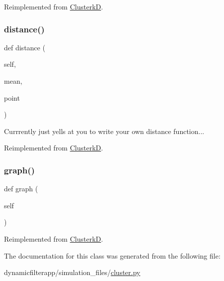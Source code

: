 Reimplemented from \mbox{\hyperlink{classdynamicfilterapp_1_1simulation__files_1_1cluster_1_1_clusterk_d_aac77177976d5d302c5b583d66aec9275}{ClusterkD}}.

\mbox{\label{classdynamicfilterapp_1_1simulation__files_1_1cluster_1_1_cluster1_d_a52f9d99950e63d5a8748e36e2ccfd48a}} 
\subsubsection{\texorpdfstring{distance()}{distance()}}
{\footnotesize\ttfamily def distance (\begin{DoxyParamCaption}\item[{}]{self,  }\item[{}]{mean,  }\item[{}]{point }\end{DoxyParamCaption})}

\begin{DoxyVerb}Currrently just yells at you to write your own distance function...
\end{DoxyVerb}
 

Reimplemented from \mbox{\hyperlink{classdynamicfilterapp_1_1simulation__files_1_1cluster_1_1_clusterk_d_a52f9d99950e63d5a8748e36e2ccfd48a}{ClusterkD}}.

\mbox{\label{classdynamicfilterapp_1_1simulation__files_1_1cluster_1_1_cluster1_d_a32122ca5e18d511dacbccf1be6e60dbd}} 
\subsubsection{\texorpdfstring{graph()}{graph()}}
{\footnotesize\ttfamily def graph (\begin{DoxyParamCaption}\item[{}]{self }\end{DoxyParamCaption})}



Reimplemented from \mbox{\hyperlink{classdynamicfilterapp_1_1simulation__files_1_1cluster_1_1_clusterk_d_a32122ca5e18d511dacbccf1be6e60dbd}{ClusterkD}}.



The documentation for this class was generated from the following file\+:\begin{DoxyCompactItemize}
\item 
dynamicfilterapp/simulation\+\_\+files/\mbox{\hyperlink{cluster_8py}{cluster.\+py}}\end{DoxyCompactItemize}
